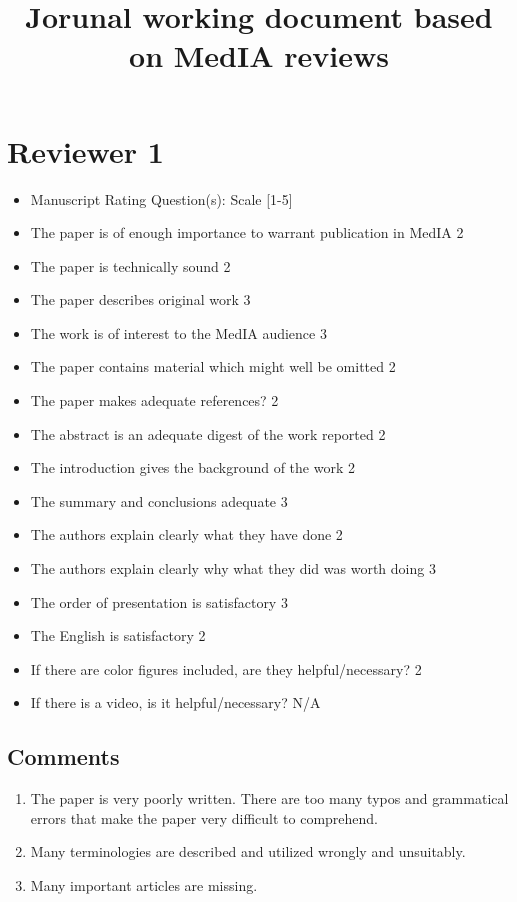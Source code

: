 \documentclass[]{tufte-handout}
\title{Jorunal working document based on MedIA reviews}
\begin{document}
\maketitle

\section{Reviewer 1}
\begin{itemize}[noitemsep,topsep=0pt,parsep=0pt,partopsep=0pt]
\small
\item Manuscript Rating Question(s):  Scale   [1-5]
\item The paper is of enough importance to warrant publication in MedIA  2
\item The paper is technically sound  2
\item The paper describes original work  3
\item The work is of interest to the MedIA audience  3
\item The paper contains material which might well be omitted  2
\item The paper makes adequate references?  2
\item The abstract is an adequate digest of the work reported  2
\item The introduction gives the background of the work  2
\item The summary and conclusions adequate  3
\item The authors explain clearly what they have done  2
\item The authors explain clearly why what they did was worth doing  3
\item The order of presentation is satisfactory  3
\item The English is satisfactory  2
\item If there are color figures included, are they helpful/necessary?  2
\item If there is a video, is it helpful/necessary?  N/A
\end{itemize}
 
\subsection{Comments}
 
\begin{enumerate}
\item The paper is very poorly written.  There are too many typos and grammatical errors that make the paper very difficult to comprehend.
\item Many terminologies are described and utilized wrongly and unsuitably.
\item Many important articles are missing.
\end{enumerate}
\end{document}
